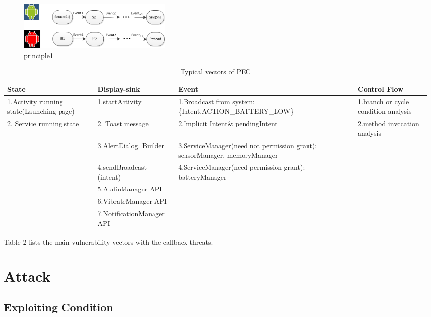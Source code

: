 \documentclass{sig-alternate-05-2015}
\begin{document}
\begin{figure}
\centering
\includegraphics[width = 3.0in]{principle.png}
\caption{\label{}principle1}
\end{figure}



\begin{table}[htbp]
\centering
 \caption{\label{tab:test} Typical vectors of PEC}
 \begin{tabularx}{\linewidth}{XXXX}

  \toprule
  State & Display-sink & Event & Control Flow \\
  \midrule
 1.Activity running state(Launching page) & 1.startActivity & 1.Broadcast from system: \{Intent.ACTION\_BATTERY\_LOW\} & 1.branch or cycle condition analysis \\
  2. Service running state &2. Toast message & 2.Implicit Intent\& pendingIntent & 2.method invocation analysis\\
     & 3.AlertDialog. Builder & 3.ServiceManager(need not permission grant): { sensorManager, memoryManager }\\
     & 4.sendBroadcast (intent)& 4.ServiceManager(need permission grant): { batteryManager }\\     
     & 5.AudioManager API & \\
     & 6.VibrateManager API & \\
     & 7.NotificationManager API & \\
     
  \bottomrule
 \end{tabularx}
\end{table}



{\color{red}Table 2} lists the main vulnerability vectors with the callback threats. 

\section{Attack}

\subsection{Exploiting Condition}
\end{document}
